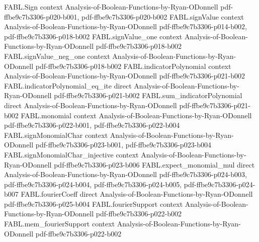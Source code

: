 \begin{theorem}
\label{FABL.totalStableInfluence_one_sub_le_inv}
\leanok
{}
\proofstep
  {FABL.Sign}
  {context}
  {Analysis-of-Boolean-Functions-by-Ryan-ODonnell}
  {pdf-ffbe9c7b3306-p020-b001,
    pdf-ffbe9c7b3306-p020-b002}
\proofstep
  {FABL.signValue}
  {context}
  {Analysis-of-Boolean-Functions-by-Ryan-ODonnell}
  {pdf-ffbe9c7b3306-p014-b002,
    pdf-ffbe9c7b3306-p018-b002}
\proofstep
  {FABL.signValue_one}
  {context}
  {Analysis-of-Boolean-Functions-by-Ryan-ODonnell}
  {pdf-ffbe9c7b3306-p018-b002}
\proofstep
  {FABL.signValue_neg_one}
  {context}
  {Analysis-of-Boolean-Functions-by-Ryan-ODonnell}
  {pdf-ffbe9c7b3306-p018-b002}
\proofstep
  {FABL.indicatorPolynomial}
  {context}
  {Analysis-of-Boolean-Functions-by-Ryan-ODonnell}
  {pdf-ffbe9c7b3306-p021-b002}
\proofstep
  {FABL.indicatorPolynomial_eq_ite}
  {direct}
  {Analysis-of-Boolean-Functions-by-Ryan-ODonnell}
  {pdf-ffbe9c7b3306-p021-b002}
\proofstep
  {FABL.sum_indicatorPolynomial}
  {direct}
  {Analysis-of-Boolean-Functions-by-Ryan-ODonnell}
  {pdf-ffbe9c7b3306-p021-b002}
\proofstep
  {FABL.monomial}
  {context}
  {Analysis-of-Boolean-Functions-by-Ryan-ODonnell}
  {pdf-ffbe9c7b3306-p022-b001,
    pdf-ffbe9c7b3306-p022-b004}
\proofstep
  {FABL.signMonomialChar}
  {context}
  {Analysis-of-Boolean-Functions-by-Ryan-ODonnell}
  {pdf-ffbe9c7b3306-p023-b001,
    pdf-ffbe9c7b3306-p023-b004}
\proofstep
  {FABL.signMonomialChar_injective}
  {context}
  {Analysis-of-Boolean-Functions-by-Ryan-ODonnell}
  {pdf-ffbe9c7b3306-p023-b006}
\proofstep
  {FABL.expect_monomial_mul}
  {direct}
  {Analysis-of-Boolean-Functions-by-Ryan-ODonnell}
  {pdf-ffbe9c7b3306-p024-b003,
    pdf-ffbe9c7b3306-p024-b004,
    pdf-ffbe9c7b3306-p024-b005,
    pdf-ffbe9c7b3306-p024-b007}
\proofstep
  {FABL.fourierCoeff}
  {direct}
  {Analysis-of-Boolean-Functions-by-Ryan-ODonnell}
  {pdf-ffbe9c7b3306-p025-b004}
\proofstep
  {FABL.fourierSupport}
  {context}
  {Analysis-of-Boolean-Functions-by-Ryan-ODonnell}
  {pdf-ffbe9c7b3306-p022-b002}
\proofstep
  {FABL.mem_fourierSupport}
  {context}
  {Analysis-of-Boolean-Functions-by-Ryan-ODonnell}
  {pdf-ffbe9c7b3306-p022-b002}

\end{theorem}

